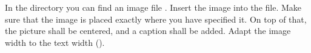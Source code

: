 In the  directory you can find an image file 
. Insert the image into the 
 file. Make sure that the image is placed 
exactly where you have specified it. On top of that, the picture shall be 
centered, and a caption shall be added. Adapt the image width to the text width 
().


